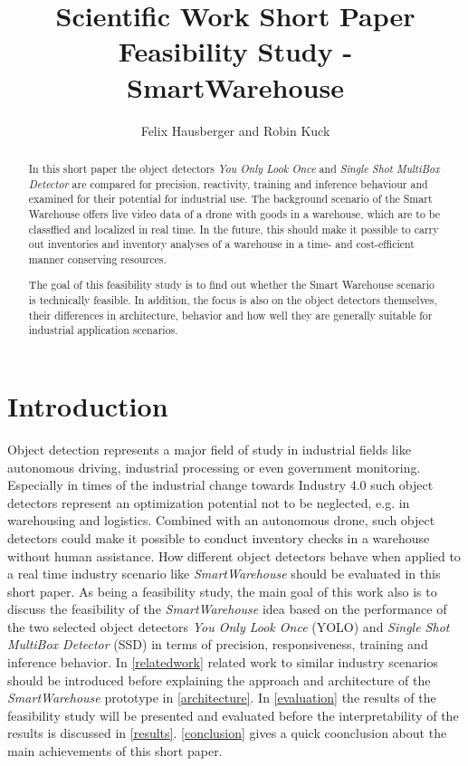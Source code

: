 \documentclass[a4paper, 10pt, journal]{wissarbIEEE}      %
\title{\LARGE \bf Scientific Work Short Paper \\Feasibility Study - SmartWarehouse}
\author{Felix Hausberger and Robin Kuck}
\begin{document}
	

\maketitle

\begin{abstract}

In this short paper the object detectors \textit{You Only Look Once} and \textit{Single Shot MultiBox Detector} are compared for precision, reactivity, training and inference behaviour and examined for their potential for industrial use. The background scenario of the Smart Warehouse offers live video data of a drone with goods in a warehouse, which are to be classffied and localized in real time. In the future, this should make it possible to carry out inventories and inventory analyses of a warehouse in a time- and cost-efficient manner conserving resources.

The goal of this feasibility study is to find out whether the Smart Warehouse scenario is technically feasible. In addition, the focus is also on the object detectors themselves, their differences in architecture, behavior and how well they are generally suitable for industrial application scenarios.

\end{abstract}

\section{Introduction}

Object detection represents a major field of study in industrial fields like autonomous driving, industrial processing or even government monitoring. Especially in times of the industrial change towards Industry 4.0 such object detectors represent an optimization potential not to be neglected, e.g. in warehousing and logistics. Combined with an autonomous drone, such object detectors could make it possible to conduct inventory checks in a warehouse without human assistance. How different object detectors behave when applied to a real time industry scenario like \textit{SmartWarehouse} should be evaluated in this short paper. As being a feasibility study, the main goal of this work also is to discuss the feasibility of the \textit{SmartWarehouse} idea based on the performance of the two selected object detectors \textit{You Only Look Once} (YOLO) and \textit{Single Shot MultiBox Detector} (SSD) in terms of precision, responsiveness, training and inference behavior. In \autoref{relatedwork} related work to similar industry scenarios should be introduced before explaining the approach and architecture of the \textit{SmartWarehouse} prototype in \autoref{architecture}. In \autoref{evaluation} the results of the feasibility study will be presented and evaluated before the interpretability of the results is discussed in \autoref{results}. \autoref{conclusion} gives a quick coonclusion about the main achievements of this short paper.
\end{document}
